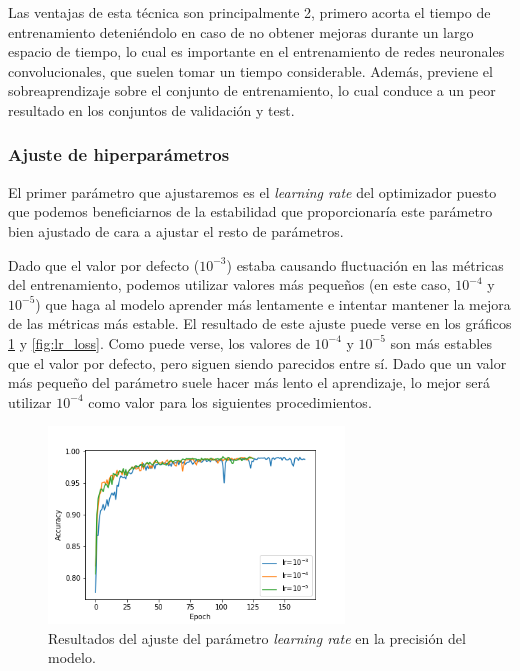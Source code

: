 Las ventajas de esta técnica son principalmente 2, primero acorta el tiempo de entrenamiento deteniéndolo en caso de no obtener mejoras durante un largo espacio de tiempo, lo cual es importante en el entrenamiento de redes neuronales convolucionales, que suelen tomar un tiempo considerable. Además, previene el sobreaprendizaje sobre el conjunto de entrenamiento, lo cual conduce a un peor resultado en los conjuntos de validación y test.

\subsubsection*{Ajuste de hiperparámetros}

El primer parámetro que ajustaremos es el \textit{learning rate} del optimizador puesto que podemos beneficiarnos de la estabilidad que proporcionaría este parámetro bien ajustado de cara a ajustar el resto de parámetros.

Dado que el valor por defecto ($10^{-3}$) estaba causando fluctuación en las métricas del entrenamiento, podemos utilizar valores más pequeños (en este caso, $10^{-4}$ y $10^{-5}$) que haga al modelo aprender más lentamente e intentar mantener la mejora de las métricas más estable. El resultado de este ajuste puede verse en los gráficos \ref{fig:lr_acc} y \ref{fig:lr_loss}. Como puede verse, los valores de $10^{-4}$ y $10^{-5}$ son más estables que el valor por defecto, pero siguen siendo parecidos entre sí. Dado que un valor más pequeño del parámetro suele hacer más lento el aprendizaje, lo mejor será utilizar $10^{-4}$ como valor para los siguientes procedimientos.

\begin{figure}[H]
  \centering
  \includegraphics[width=0.7\textwidth]{images/lr_acc.png}
  \caption{Resultados del ajuste del parámetro \textit{learning rate} en la precisión del modelo.}
  \label{fig:lr_acc}
\end{figure}

